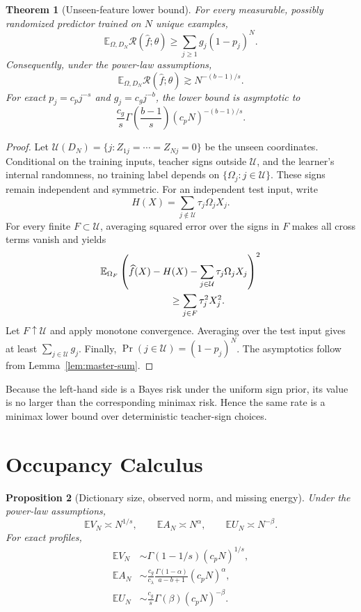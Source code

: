 \documentclass[letterpaper]{article}
\newtheorem{theorem}{Theorem}
\newtheorem{proposition}[theorem]{Proposition}
\newcommand{\E}{\mathbb E}
\newcommand{\R}{\mathcal R}
\newcommand{\1}{\mathbf 1}
\begin{document}
\begin{theorem}[Unseen-feature lower bound]
\label{thm:supp-lower}
For every measurable, possibly randomized predictor trained on $N$ unique
examples,
\[
\E_{\Omega,D_N}\R(\widehat f;\theta)
\ge
\sum_{j\ge1}g_j(1-p_j)^N.
\]
Consequently, under the power-law assumptions,
\[
\E_{\Omega,D_N}\R(\widehat f;\theta)
\gtrsim N^{-(b-1)/s}.
\]
For exact $p_j=c_pj^{-s}$ and $g_j=c_gj^{-b}$, the lower bound is
asymptotic to
\[
\frac{c_g}{s}\Gamma\!\left(\frac{b-1}{s}\right)
(c_pN)^{-(b-1)/s}.
\]
\end{theorem}

\begin{proof}
Let
$\mathcal U(D_N)=\{j:Z_{1j}=\cdots=Z_{Nj}=0\}$ be the unseen coordinates.
Conditional on the training inputs, teacher signs outside $\mathcal U$, and
the learner's internal randomness, no training label depends on
$\{\Omega_j:j\in\mathcal U\}$. These signs remain independent and symmetric.
For an independent test input, write
\[
H(X)=\sum_{j\notin\mathcal U}\tau_j\Omega_jX_j.
\]
For every finite $F\subset\mathcal U$, averaging squared error over the signs
in $F$ makes all cross terms vanish and yields
\begin{align*}
&\E_{\Omega_F}
\left(
\widehat f(X)-H(X)-\sum_{j\in\mathcal U}\tau_j\Omega_jX_j
\right)^2\\
&\hspace{25mm}\ge\sum_{j\in F}\tau_j^2X_j^2.
\end{align*}
Let $F\uparrow\mathcal U$ and apply monotone convergence. Averaging over the
test input gives at least $\sum_{j\in\mathcal U}g_j$. Finally,
$\Pr(j\in\mathcal U)=(1-p_j)^N$. The asymptotics follow from
Lemma~\ref{lem:master-sum}.
\end{proof}

Because the left-hand side is a Bayes risk under the uniform sign prior, its
value is no larger than the corresponding minimax risk. Hence the same rate is
a minimax lower bound over deterministic teacher-sign choices.

\section{Occupancy Calculus}

\begin{proposition}[Dictionary size, observed norm, and missing energy]
\label{prop:supp-occupancy}
Under the power-law assumptions,
\[
\E V_N\asymp N^{1/s},
\qquad
\E A_N\asymp N^\alpha,
\qquad
\E U_N\asymp N^{-\beta}.
\]
For exact profiles,
\begin{align*}
\E V_N
&\sim\Gamma(1-1/s)(c_pN)^{1/s},\\
\E A_N
&\sim
\frac{c_g}{c_\lambda}
\frac{\Gamma(1-\alpha)}{a-b+1}(c_pN)^\alpha,\\
\E U_N
&\sim
\frac{c_g}{s}\Gamma(\beta)(c_pN)^{-\beta}.
\end{align*}
\end{proposition}
\end{document}
